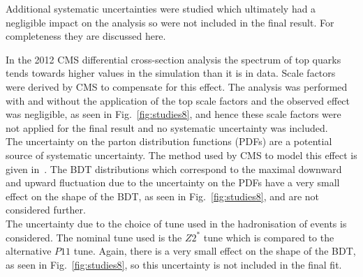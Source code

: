 Additional systematic uncertainties were studied which ultimately had a negligible impact on the analysis so were not included in the final result. For completeness they are discussed here.

In the 2012 CMS differential cross-section \ttbar analysis \cite{CMS:TopPt} the \pt spectrum of top quarks tends towards higher values in the \MADGRAPH simulation than it is in data. Scale factors were derived by CMS to compensate for this effect. The analysis was performed with and without the application of the top \pt scale factors and the observed effect was negligible, as seen in Fig.~\ref{fig:studies8}, and hence these scale factors were not applied for the final result and no systematic uncertainty was included.\\
The uncertainty on the parton distribution functions (PDFs) are a potential source of systematic uncertainty. The method used by CMS to model this effect is given in~\cite{ref:PDFUnc2}. The BDT distributions which correspond to the maximal downward and upward fluctuation due to the uncertainty on the PDFs have a very small effect on the shape of the BDT, as seen in Fig.~\ref{fig:studies8}, and are not considered further.\\
The uncertainty due to the choice of \PYTHIA tune used in the hadronisation of \ttbar events is considered. The nominal tune used is the $Z2^{*}$ tune which is compared to the alternative $P11$ tune. Again, there is a very small effect on the shape of the BDT, as seen in Fig.~\ref{fig:studies8}, so this uncertainty is not included in the final fit.

